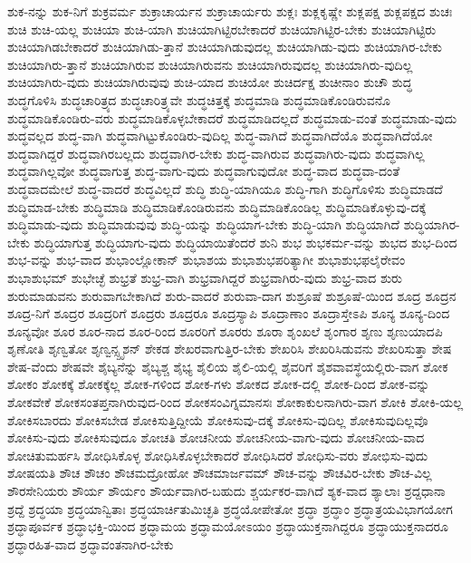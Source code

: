 {ಶುಕ-ನನ್ನು
ಶುಕ-ನಿಗೆ
ಶುಕ್ರವರ್ಮ
ಶುಕ್ರಾಚಾರ್ಯನ
ಶುಕ್ರಾಚಾರ್ಯರು
ಶುಕ್ಲಃ
ಶುಕ್ಲಕೃಷ್ಣೇ
ಶುಕ್ಲಪಕ್ಷ
ಶುಕ್ಲಪಕ್ಷದ
ಶುಚಃ
ಶುಚಿ
ಶುಚಿ-ಯಲ್ಲ
ಶುಚಿಯಾ
ಶುಚಿ-ಯಾಗಿ
ಶುಚಿಯಾಗಿಟ್ಟಿರಬೇಕಾದರೆ
ಶುಚಿಯಾಗಿಟ್ಟಿರ-ಬೇಕು
ಶುಚಿಯಾಗಿಟ್ಟಿರು
ಶುಚಿಯಾಗಿಡಬೇಕಾದರೆ
ಶುಚಿಯಾಗಿಡು-ತ್ತಾನೆ
ಶುಚಿಯಾಗಿಡುವುದಲ್ಲ
ಶುಚಿಯಾಗಿಡು-ವುದು
ಶುಚಿಯಾಗಿರ-ಬೇಕು
ಶುಚಿಯಾಗಿರು-ತ್ತಾನೆ
ಶುಚಿಯಾಗಿರುವ
ಶುಚಿಯಾಗಿರುವನು
ಶುಚಿಯಾಗಿರುವುದಲ್ಲ
ಶುಚಿಯಾಗಿರು-ವುದಿಲ್ಲ
ಶುಚಿಯಾಗಿರು-ವುದು
ಶುಚಿಯಾಗಿರುವುವು
ಶುಚಿ-ಯಾದ
ಶುಚಿಯೋ
ಶುಚಿರ್ದಕ್ಷ
ಶುಚೀನಾಂ
ಶುಚೌ
ಶುದ್ಧ
ಶುದ್ಧಗೊಳಿಸಿ
ಶುದ್ಧಚಾರಿತ್ರ್ಯದ
ಶುದ್ಧಚಾರಿತ್ರ್ಯವೇ
ಶುದ್ಧಚಿತ್ತಕ್ಕೆ
ಶುದ್ಧಮಾಡಿ
ಶುದ್ಧಮಾಡಿಕೊಂಡಿರುವನೊ
ಶುದ್ಧಮಾಡಿಕೊಂಡಿರು-ವರು
ಶುದ್ಧಮಾಡಿಕೊಳ್ಳಬೇಕಾದರೆ
ಶುದ್ಧಮಾಡಿದಲ್ಲದೆ
ಶುದ್ಧಮಾಡು-ವಂತೆ
ಶುದ್ಧಮಾಡು-ವುದು
ಶುದ್ಧವಲ್ಲದ
ಶುದ್ಧ-ವಾಗಿ
ಶುದ್ಧವಾಗಿಟ್ಟುಕೊಂಡಿರು-ವುದಿಲ್ಲ
ಶುದ್ಧ-ವಾಗಿದೆ
ಶುದ್ಧವಾಗಿದೆಯೊ
ಶುದ್ಧವಾಗಿದೆಯೋ
ಶುದ್ಧವಾಗಿದ್ದರೆ
ಶುದ್ಧವಾಗಿರಬಲ್ಲದು
ಶುದ್ಧವಾಗಿರ-ಬೇಕು
ಶುದ್ಧ-ವಾಗಿರುವ
ಶುದ್ಧವಾಗಿರು-ವುದು
ಶುದ್ಧವಾಗಿಲ್ಲ
ಶುದ್ಧವಾಗಿಲ್ಲವೋ
ಶುದ್ಧವಾಗುತ್ತ
ಶುದ್ಧ-ವಾಗು-ವುದು
ಶುದ್ಧವಾಗುವುದೋ
ಶುದ್ಧ-ವಾದ
ಶುದ್ಧವಾ-ದಂತೆ
ಶುದ್ಧವಾದಮೇಲೆ
ಶುದ್ಧ-ವಾದರೆ
ಶುದ್ಧವಿಲ್ಲದೆ
ಶುದ್ಧಿ
ಶುದ್ಧಿ-ಯಾಗಿಯೂ
ಶುದ್ಧಿ-ಗಾಗಿ
ಶುದ್ಧಿಗೊಳಿಸು
ಶುದ್ಧಿಮಾಡದೆ
ಶುದ್ಧಿಮಾಡ-ಬೇಕು
ಶುದ್ಧಿಮಾಡಿ
ಶುದ್ಧಿಮಾಡಿಕೊಂಡಿರುವನು
ಶುದ್ಧಿಮಾಡಿಕೊಂಡಿಲ್ಲ
ಶುದ್ಧಿಮಾಡಿಕೊಳ್ಳುವು-ದಕ್ಕೆ
ಶುದ್ಧಿಮಾಡು-ವುದು
ಶುದ್ಧಿಮಾಡುವುವು
ಶುದ್ಧಿ-ಯನ್ನು
ಶುದ್ಧಿಯಾಗ-ಬೇಕು
ಶುದ್ಧಿ-ಯಾಗಿ
ಶುದ್ಧಿಯಾಗಿದೆ
ಶುದ್ಧಿಯಾಗಿರ-ಬೇಕು
ಶುದ್ಧಿಯಾಗುತ್ತ
ಶುದ್ಧಿಯಾಗು-ವುದು
ಶುದ್ಧಿಯಾಯಿತೆಂದರೆ
ಶುನಿ
ಶುಭ
ಶುಭಕರ್ಮ-ವನ್ನು
ಶುಭದ
ಶುಭ-ದಿಂದ
ಶುಭ-ವನ್ನು
ಶುಭ-ವಾದ
ಶುಭಾಂಲ್ಲೋಕಾನ್
ಶುಭಾಶಯ
ಶುಭಾಶುಭಪರಿತ್ಯಾಗೀ
ಶುಭಾಶುಭಫಲೈರೇವಂ
ಶುಭಾಶುಭಮ್
ಶುಭೇಚ್ಛೆ
ಶುಭ್ರತೆ
ಶುಭ್ರ-ವಾಗಿ
ಶುಭ್ರವಾಗಿದ್ದರೆ
ಶುಭ್ರವಾಗಿರು-ವುದು
ಶುಭ್ರ-ವಾದ
ಶುರು
ಶುರುಮಾಡುವನು
ಶುರುವಾಗಬೇಕಾಗಿದೆ
ಶುರು-ವಾದರೆ
ಶುರುವಾ-ದಾಗ
ಶುಶ್ರೂಷೆ
ಶುಶ್ರೂಷೆ-ಯಿಂದ
ಶೂದ್ರ
ಶೂದ್ರನ
ಶೂದ್ರ-ನಿಗೆ
ಶೂದ್ರರ
ಶೂದ್ರರಿಗೆ
ಶೂದ್ರರು
ಶೂದ್ರರೂ
ಶೂದ್ರಸ್ಯಾಪಿ
ಶೂದ್ರಾಣಾಂ
ಶೂದ್ರಾಸ್ತೇಽಪಿ
ಶೂನ್ಯ
ಶೂನ್ಯ-ದಿಂದ
ಶೂನ್ಯವೋ
ಶೂರ
ಶೂರ-ನಾದ
ಶೂರ-ರಿಂದ
ಶೂರರಿಗೆ
ಶೂರರು
ಶೂರಾ
ಶೃಂಖಲೆ
ಶೃಂಗಾರ
ಶೃಣು
ಶೃಣುಯಾದಪಿ
ಶೃಣೋತಿ
ಶೃಣ್ವತೋ
ಶೃಣ್ವನ್ಸ್ಪೃಶನ್
ಶೇಕಡ
ಶೇಖರವಾಗುತ್ತಿರ-ಬೇಕು
ಶೇಖರಿಸಿ
ಶೇಖರಿಸಿಡುವನು
ಶೇಖರಿಸುತ್ತಾ
ಶೇಷ
ಶೇಷ-ವೆಂದು
ಶೇಷವೇ
ಶೈಬ್ಯನೆನ್ನು
ಶೈಬ್ಯಶ್ಚ
ಶೈಭ್ಯ
ಶೈಲಿಯ
ಶೈಲಿ-ಯಲ್ಲಿ
ಶೈವರಿಗೆ
ಶೈಶವಾವಸ್ಥೆಯಲ್ಲಿರು-ವಾಗ
ಶೋಕ
ಶೋಕಂ
ಶೋಕಕ್ಕೆ
ಶೋಕಕ್ಕೆಲ್ಲ
ಶೋಕ-ಗಳಿಂದ
ಶೋಕ-ಗಳು
ಶೋಕದ
ಶೋಕ-ದಲ್ಲಿ
ಶೋಕ-ದಿಂದ
ಶೋಕ-ವನ್ನು
ಶೋಕವೇಕೆ
ಶೋಕಸಂತಪ್ತನಾಗಿರುವುದ-ರಿಂದ
ಶೋಕಸಂವಿಗ್ನಮಾನಸಃ
ಶೋಕಾಕುಲನಾಗಿರು-ವಾಗ
ಶೋಕಿ
ಶೋಕಿ-ಯಲ್ಲ
ಶೋಕಿಸಬಾರದು
ಶೋಕಿಸಬೇಡ
ಶೋಕಿಸುತ್ತಿದ್ದೀಯೆ
ಶೋಕಿಸುವು-ದಕ್ಕೆ
ಶೋಕಿಸು-ವುದಿಲ್ಲ
ಶೋಕಿಸುವುದಿಲ್ಲವೊ
ಶೋಕಿಸು-ವುದು
ಶೋಕಿಸುವುದೂ
ಶೋಚತಿ
ಶೋಚನೀಯ
ಶೋಚನೀಯ-ವಾಗು-ವುದು
ಶೋಚನೀಯ-ವಾದ
ಶೋಚಿತುಮರ್ಹಸಿ
ಶೋಧಿಸಿಕೊಳ್ಳ
ಶೋಧಿಸಿಕೊಳ್ಳಬೇಕಾದರೆ
ಶೋಧಿಸಿದರೆ
ಶೋಧಿಸು-ವರು
ಶೋಭಿಸು-ವುದು
ಶೋಷಯತಿ
ಶೌಚ
ಶೌಚಂ
ಶೌಚಮದ್ರೋಹೋ
ಶೌಚಮಾರ್ಜವಮ್
ಶೌಚ-ವನ್ನು
ಶೌಚವಿರ-ಬೇಕು
ಶೌಚ-ವಿಲ್ಲ
ಶೌರಸೇನಿಯರು
ಶೌರ್ಯ
ಶೌರ್ಯಂ
ಶೌರ್ಯವಾಗಿರ-ಬಹುದು
ಶ್ಚರ್ಯಕರ-ವಾಗಿದೆ
ಶ್ಯಕ-ವಾದ
ಶ್ಯಾಲಾಃ
ಶ್ರದ್ದಧಾನಾ
ಶ್ರದ್ದೆ
ಶ್ರದ್ಧಯಾ
ಶ್ರದ್ಧಯಾನ್ವಿತಾಃ
ಶ್ರದ್ಧಯಾರ್ಚಿತುಮಿಚ್ಛತಿ
ಶ್ರದ್ಧಯೋಪೇತೋ
ಶ್ರದ್ಧಾ
ಶ್ರದ್ಧಾಂ
ಶ್ರದ್ಧಾತ್ರಯವಿಭಾಗಯೋಗ
ಶ್ರದ್ಧಾಪೂರ್ವಕ
ಶ್ರದ್ಧಾಭಕ್ತಿ-ಯಿಂದ
ಶ್ರದ್ಧಾಮಯ
ಶ್ರದ್ಧಾಮಯೋಽಯಂ
ಶ್ರದ್ಧಾಯುಕ್ತನಾಗಿದ್ದರೂ
ಶ್ರದ್ಧಾಯುಕ್ತನಾದರೂ
ಶ್ರದ್ಧಾರಹಿತ-ವಾದ
ಶ್ರದ್ಧಾವಂತನಾಗಿರ-ಬೇಕು
}
